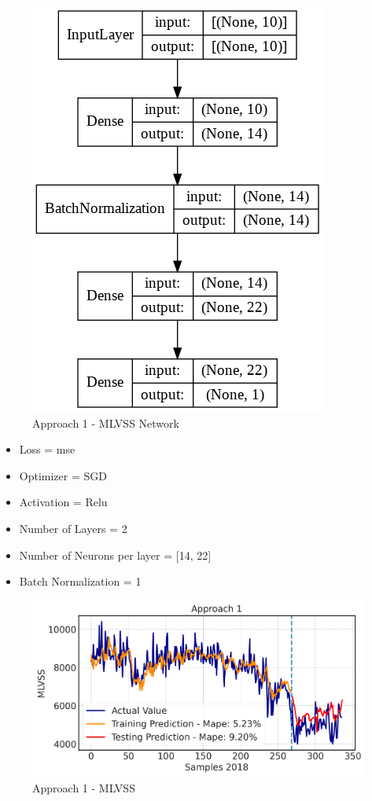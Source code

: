 \begin{figure}[h!]
\centering
\includegraphics[width=0.4\linewidth]{figures/Ch5/App1_MLVSS.png}
\caption{Approach 1 - MLVSS Network}
\label{f:App1-MLVSS-nn}
\end{figure}

\begin{itemize}
    \item Loss = mse
    \item Optimizer = SGD
    \item Activation =  Relu
    \item Number of Layers = 2
    \item Number of Neurons per layer = [14, 22]
    \item Batch Normalization = 1
\end{itemize}
\begin{figure}[h]
\centering
\includegraphics[width=\linewidth]{figures/Ch5/MVLSS-approach1.png}
\caption{Approach 1 - MLVSS}
\label{f:App1-MLVSS}
\end{figure}





